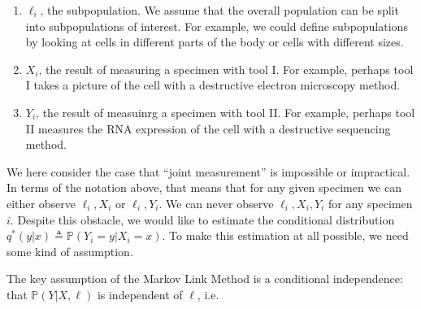 \begin{enumerate}
\item $\ell_i$, the subpopulation.  We assume that the overall population can be split into subpopulations of interest.  For example, we could define subpopulations by looking at cells in different parts of the body or cells with different sizes.  
\item $X_i$, the result of measuring a specimen with tool I.  For example, perhaps tool I takes a picture of the cell with a destructive electron microscopy method.
\item $Y_i$, the result of measuinrg a specimen with tool II.  For example, perhaps tool II measures the RNA expression of the cell with a destructive sequencing method.
\end{enumerate}

We here consider the case that ``joint measurement'' is impossible or impractical.  In terms of the notation above, that means that for any given specimen we can either observe $\ell_i, X_i$ or $\ell_i,Y_i$.  We can never observe $\ell_i,X_i,Y_i$ for any specimen $i$.  Despite this obstacle, we would like to estimate the conditional distribution $q^*(y|x)\triangleq \mathbb{P}(Y_i=y|X_i=x)$.  To make this estimation at all possible, we need some kind of assumption.


The key assumption of the Markov Link Method is a conditional independence: that $\mathbb{P}(Y|X,\ell)$ is independent of $\ell$, i.e. 

\begin{center}
\end{center}

